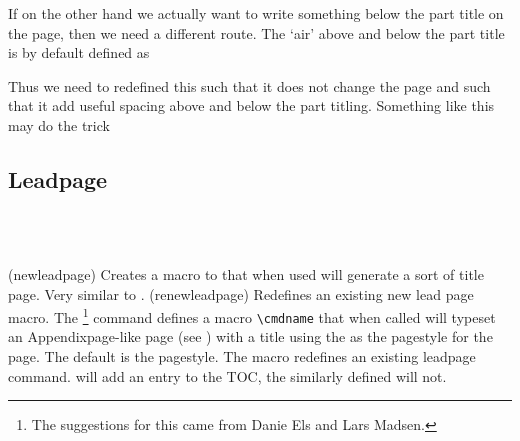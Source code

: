 If on the other hand we actually want to write something below the
part title on the \cmd{\part} page, then we need a different
route. The `air' above and below the part title is by default defined as
\begin{lcode}
  \newcommand*{\beforepartskip}{\null\vfil}
  \newcommand*{\afterpartskip}{\vfil\newpage}
\end{lcode}
Thus we need to redefined this such that it does not change the page
and such that it add useful spacing above and below the part
titling. Something like this may do the trick
\begin{lcode}
\makeatletter
  \newcommand*{\beforepartskip}{\null\vskip4cm}
  \newcommand*{\afterpartskip}{\par\vskip1cm%
    \@afterindentfalse\@afterheading}
\makeatother
\end{lcode}




\subsection{Leadpage}

\begin{syntax}
\cmd{\newleadpage} \\
\cmd{\renewleadpage} \\
\end{syntax}
\glossary(newleadpage)%
{}%
{Creates a macro to that when used will generate a sort of title
page. Very similar to .}
\glossary(renewleadpage)%
{}%
{Redefines an existing new lead page macro.}
The \cmd{\newleadpage}\footnote{The suggestions for this came from
Danie Els and Lars Madsen.}
command defines a macro \verb?\cmdname? that when called
will typeset an Appendixpage-like page (see ) with a
title  using the  as the pagestyle for
the page. The default is the  pagestyle. The macro
\cmd{\renewleadpage} redefines an existing leadpage command.
\cmd{\cmdname} will add an entry to the TOC, the similarly defined
\cmd{\cmdname*} will not.


